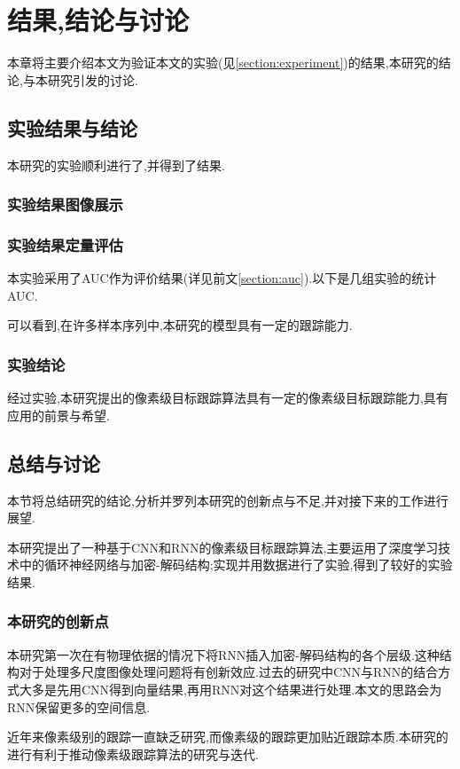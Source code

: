 
\chapter{结果,结论与讨论}
本章将主要介绍本文为验证本文的实验(见\ref{section:experiment})的结果,本研究的结论,与本研究引发的讨论.
\section{实验结果与结论}
本研究的实验顺利进行了,并得到了结果.
\subsection{实验结果图像展示}
\subsection{实验结果定量评估}
本实验采用了AUC作为评价结果(详见前文\ref{section:auc}).以下是几组实验的统计AUC.
\par
可以看到,在许多样本序列中,本研究的模型具有一定的跟踪能力.
\subsection{实验结论}
经过实验,本研究提出的像素级目标跟踪算法具有一定的像素级目标跟踪能力,具有应用的前景与希望.

\section{总结与讨论}
本节将总结研究的结论,分析并罗列本研究的创新点与不足,并对接下来的工作进行展望.
\par
本研究提出了一种基于CNN和RNN的像素级目标跟踪算法,主要运用了深度学习技术中的循环神经网络与加密-解码结构;实现并用数据进行了实验,得到了较好的实验结果.
\subsection{本研究的创新点}
本研究第一次在有物理依据的情况下将RNN插入加密-解码结构的各个层级.这种结构对于处理多尺度图像处理问题将有创新效应.过去的研究中CNN与RNN的结合方式大多是先用CNN得到向量结果,再用RNN对这个结果进行处理.本文的思路会为RNN保留更多的空间信息.
\par
近年来像素级别的跟踪一直缺乏研究,而像素级的跟踪更加贴近跟踪本质.本研究的进行有利于推动像素级跟踪算法的研究与迭代.
